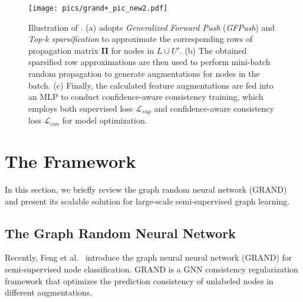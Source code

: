 


\begin{figure*}[ht]
	\centering
	\texttt{[image: pics/grand+\_pic\_new2.pdf]}
	\vspace{-0.15in}
	\caption{Illustration of \model.  \textmd{\small (a) \model adopts \textit{Generalized Forward Push} (\textit{GFPush}) and \textit{Top-k sparsification} to approximate the corresponding rows of propagation matrix $\mathbf{\Pi}$ for nodes in $L \cup U'$. (b) The obtained sparsified row approximations are then used to perform mini-batch random propagation to generate augmentations for nodes in the batch. (c) Finally, the calculated feature augmentations are fed into an MLP to conduct confidence-aware consistency training, which employs both supervised loss $\mathcal{L}_{sup}$ and confidence-aware consistency loss $\mathcal{L}_{con}$  for model optimization.}}
\label{fig:arc}
	\vspace{-0.06in}
\end{figure*}

\section{The \model Framework}
\label{sec:method}

In this section, we briefly review the graph random neural network (GRAND) and present its scalable solution \model for large-scale semi-supervised graph learning. 

\subsection{The Graph Random Neural Network}


Recently, Feng et al.~\cite{feng2020grand} introduce the graph neural neural network (GRAND) for semi-supervised node classification. 
GRAND is a GNN consistency regularization framework that optimizes the prediction consistency of unlabeled nodes in different augmentations. 


